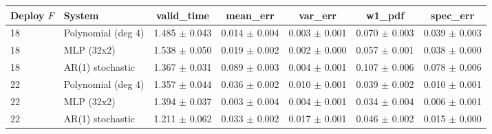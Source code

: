 \begin{tabular}{llccccc}
\toprule
Deploy $F$ & System & valid\_time & mean\_err & var\_err & w1\_pdf & spec\_err \\
\midrule
18 & Polynomial (deg 4) & 1.485 $\pm$ 0.043 & 0.014 $\pm$ 0.004 & 0.003 $\pm$ 0.001 & 0.070 $\pm$ 0.003 & 0.039 $\pm$ 0.003 \\
18 & MLP (32x2) & 1.538 $\pm$ 0.050 & 0.019 $\pm$ 0.002 & 0.002 $\pm$ 0.000 & 0.057 $\pm$ 0.001 & 0.038 $\pm$ 0.000 \\
18 & AR(1) stochastic & 1.367 $\pm$ 0.031 & 0.089 $\pm$ 0.003 & 0.004 $\pm$ 0.001 & 0.107 $\pm$ 0.006 & 0.078 $\pm$ 0.006 \\
\midrule
22 & Polynomial (deg 4) & 1.357 $\pm$ 0.044 & 0.036 $\pm$ 0.002 & 0.010 $\pm$ 0.001 & 0.039 $\pm$ 0.002 & 0.010 $\pm$ 0.001 \\
22 & MLP (32x2) & 1.394 $\pm$ 0.037 & 0.003 $\pm$ 0.004 & 0.004 $\pm$ 0.001 & 0.034 $\pm$ 0.004 & 0.006 $\pm$ 0.001 \\
22 & AR(1) stochastic & 1.211 $\pm$ 0.062 & 0.033 $\pm$ 0.002 & 0.017 $\pm$ 0.001 & 0.046 $\pm$ 0.002 & 0.015 $\pm$ 0.000 \\
\bottomrule
\end{tabular}
